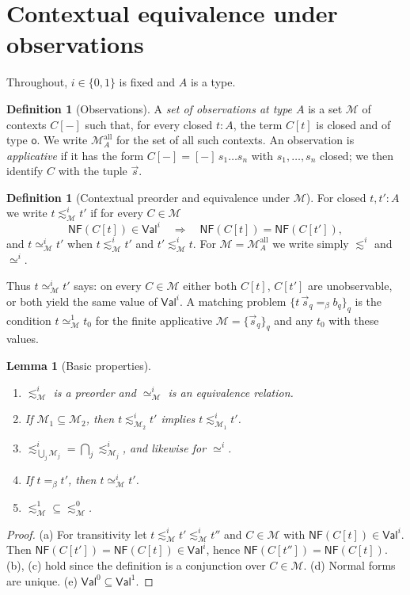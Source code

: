 \documentclass[11pt]{article}
\newcommand{\Ground}{\mathsf{o}\xspace}
\newcommand{\NF}{\mathsf{NF}\xspace}
\newcommand{\Val}{\mathsf{Val}\xspace}
\newcommand{\ObsEq}{\mathrel{\simeq}\xspace}
\newcommand{\ObsLeq}{\mathrel{\lesssim}\xspace}
\newtheorem{lemma}[theorem]{Lemma}
\theoremstyle{definition}
\newtheorem{definition}[theorem]{Definition}
\begin{document}
\section{Contextual equivalence under observations}\label{sec:obs}

Throughout, $i\in\{0,1\}$ is fixed and $A$ is a type.

\begin{definition}[Observations]
A \emph{set of observations at type $A$} is a set $\mathcal M$ of
contexts $C[-]$ such that, for every closed $t:A$, the term $C[t]$ is
closed and of type $\Ground$.  We write $\mathcal M^{\mathrm{all}}_A$ for
the set of all such contexts.  An observation is \emph{applicative} if it
has the form $C[-]=[-]\,s_1\ldots s_n$ with $s_1,\ldots,s_n$ closed; we
then identify $C$ with the tuple $\vec s$.
\end{definition}

\begin{definition}[Contextual preorder and equivalence under $\mathcal M$]
For closed $t,t':A$ we write $t\ObsLeq^i_{\mathcal M}t'$ if for every
$C\in\mathcal M$
\[
        \NF(C[t])\in\Val^i
        \quad\Longrightarrow\quad
        \NF(C[t])=\NF(C[t']),
\]
and $t\ObsEq^i_{\mathcal M}t'$ when $t\ObsLeq^i_{\mathcal M}t'$ and
$t'\ObsLeq^i_{\mathcal M}t$.  For $\mathcal M=\mathcal M^{\mathrm{all}}_A$
we write simply $\ObsLeq^i$ and $\ObsEq^i$.
\end{definition}

Thus $t\ObsEq^i_{\mathcal M}t'$ says: on every $C\in\mathcal M$ either
both $C[t]$, $C[t']$ are unobservable, or both yield the same value of
$\Val^i$.  A matching problem $\{t\,\vec s_q=_\beta b_q\}_q$ is the
condition $t\ObsEq^1_{\mathcal M}t_0$ for the finite applicative
$\mathcal M=\{\vec s_q\}_q$ and any $t_0$ with these values.

\begin{lemma}[Basic properties]\label{lem:basic}
\begin{enumerate}[label=(\alph*)]
\item $\ObsLeq^i_{\mathcal M}$ is a preorder and $\ObsEq^i_{\mathcal M}$ is
  an equivalence relation.
\item If $\mathcal M_1\subseteq\mathcal M_2$, then
  $t\ObsLeq^i_{\mathcal M_2}t'$ implies $t\ObsLeq^i_{\mathcal M_1}t'$.
\item ${\ObsLeq^i_{\bigcup_j\mathcal M_j}}=\bigcap_j{\ObsLeq^i_{\mathcal M_j}}$,
  and likewise for $\ObsEq^i$.
\item If $t=_\beta t'$, then $t\ObsEq^i_{\mathcal M}t'$.
\item $\ObsLeq^1_{\mathcal M}\subseteq\ObsLeq^0_{\mathcal M}$.
\end{enumerate}
\end{lemma}
\begin{proof}
(a) For transitivity let $t\ObsLeq^i_{\mathcal M}t'\ObsLeq^i_{\mathcal M}t''$
and $C\in\mathcal M$ with $\NF(C[t])\in\Val^i$.  Then
$\NF(C[t'])=\NF(C[t])\in\Val^i$, hence $\NF(C[t''])=\NF(C[t])$.  (b),
(c) hold since the definition is a conjunction over $C\in\mathcal M$.
(d) Normal forms are unique.  (e) $\Val^0\subseteq\Val^1$.
\end{proof}
\end{document}
